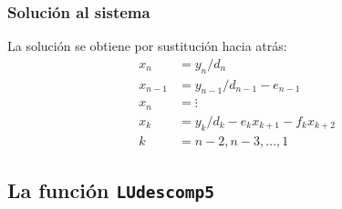 \documentclass[12pt]{beamer}
\begin{document}
\begin{frame}
\frametitle{Solución al sistema}
La solución se obtiene por sustitución hacia atrás:
\pause
\begin{align*}
x_{n} &= y_{n} / d_{n} \\[0.5em]
x_{n-1} &= y_{n-1} / d_{n-1} - e_{n-1} \\[0.5em]
x_{n}& = \vdots \\[0.5em]
x_{k} &= y_{k} / d_{k} - e_{k} x_{k+1} - f_{k} x_{k+2} \\[0.5em]
k &= n - 2, n - 3, \ldots, 1
\end{align*}
\end{frame}

\subsection{La función \texttt{LUdescomp5}}
\end{document}
